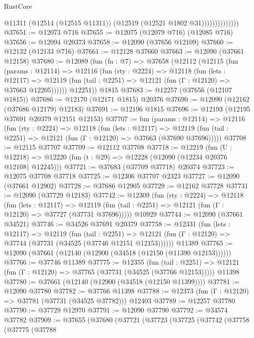\begin{lexlean}{RustCore}
\begin{coremodule}
                            @11311
                            (@12514 (@12515 @11311))
                            (@12519 (@12521 @1802 @31))))))))))))))
@37651 := @12073 @716
@37655 := @12075 (@12079 @716) (@12085 @716)
@37656 := @12094 @20373
@37658 := @12090 (@37656 @12109)
@37660 := @12132 (@12133 @716)
@37661 := @12128 @37660
@37663 := @12090 (@37661 @12158)
@37680 := @12089
    (fun (fn : @7) =>
    @37658
      (@12112
        (@12115
          (fun (params : @12114) =>
          @12116
            (fun (rty : @2224) =>
            @12118
              (fun (lets : @12117) =>
              @12119 (fun (tail : @2251) => @12121 (fun (Γ : @12120) => @37663 @12205))))))
        @12251))
    @1815
@37683 := @12257 (@37656 (@12107 @1815))
@37686 := @12170 (@12171 @1815) @20376
@37690 := @12090 (@12162 (@37686 @12179) @12183)
@37691 := @12196 @1815
@37696 := @12193 (@12195 @37691 @20379 @12151 @12153)
@37707 := fun (params : @12114) =>
  @12116
    (fun (rty : @2224) =>
    @12118
      (fun (lets : @12117) =>
      @12119 (fun (tail : @2251) => @12121 (fun (Γ : @12120) => @37663 (@37690 @37696)))))
@37708 := @12115 @37707
@37709 := @12112 @37708
@37718 := @12219
    (fun (U : @12218) => @12220 (fun (t : @29) => @12228 (@12090 (@12234 @20376 @12108) @12245)))
@37721 := @37683 (@37709 @37718) @20374
@37723 := @12075 @37708 @37718
@37725 := @12306 @37707 @2323
@37727 := @12090 (@37661 @12902)
@37728 := @37686 @12905
@37729 := @12162 @37728
@37731 := @12090 (@37729 @12183)
@37742 := @12309
    (fun (rty : @2224) =>
    @12118
      (fun (lets : @12117) =>
      @12119 (fun (tail : @2251) => @12121 (fun (Γ : @12120) => @37727 (@37731 @37696)))))
    @10929
@37744 := @12090 (@37661 @34521)
@37746 := @34526 @37691 @20379
@37758 := @12331
    (fun (lets : @12117) =>
    @12119
      (fun (tail : @2251) =>
      @12121 (fun (Γ : @12120) => @37744 (@37731 (@34525 (@37746 @12151 @12153))))))
    @11389
@37765 := @12090 (@37661 (@12140 (@12900 (@34518 (@12150 (@11390 @12153))))))
@37766 := @37746 @11389
@37775 := @12355
    (fun (tail : @2251) => @12121 (fun (Γ : @12120) => @37765 (@37731 (@34525 (@37766 @12153)))))
    @11398
@37780 := @37661 (@12140 (@12900 (@34518 (@12150 @11399))))
@37781 := @12090 @37780
@37782 := @37766 @11398
@37788 := @12373 (fun (Γ : @12120) => @37781 (@37731 (@34525 @37782))) @12403
@37789 := @12257 @37780
@37790 := @37729 @12970
@37791 := @12090 @37790
@37792 := @34574 @37782
@37909 := @37655
    (@37680
      (@37721
        (@37723
          (@37725
            (@37742
              (@37758
                (@37775
                  (@37788

\end{coremodule}
\end{lexlean}
